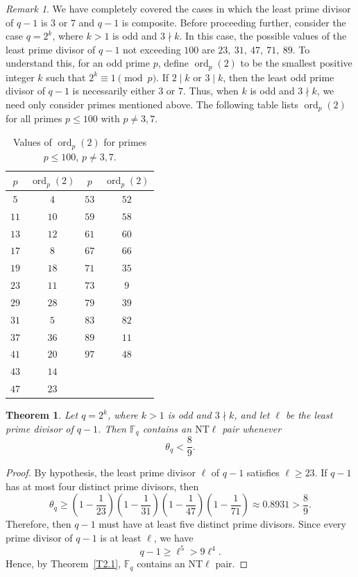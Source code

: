 \documentclass[12pt]{amsart}
\newtheorem{theorem}{Theorem}[section]
\theoremstyle{definition}
\theoremstyle{remark}
\newtheorem*{remark}{Remark}
\numberwithin{equation}{section}
\begin{document}
\begin{remark}
We have completely covered the cases in which the least prime divisor of $q-1$ is $3$ or $7$ and $q-1$ is composite. Before proceeding further, consider the case $q=2^k$, where $k>1$ is odd and $3\nmid k$. In this case, the possible values of the least prime divisor of $q-1$ not exceeding $100$ are $23,\ 31,\ 47,\ 71,\ 89$.
To understand this, for an odd prime $p$, define $\operatorname{ord}_p(2)$ to be the smallest positive integer $k$ such that $2^k\equiv1\pmod p$.
If $2\mid k$ or $3\mid k$, then the least odd prime divisor of $q-1$ is necessarily either $3$ or $7$. Thus, when $k$ is odd and $3\nmid k$, we need only consider primes mentioned above. The following table lists $\operatorname{ord}_p(2)$ for all primes $p\leq100$ with $p\neq3,7$.

\begin{table}[h]
\centering
\small
\begin{tabular}{c|c||c|c}
\hline
$p$ & $\operatorname{ord}_p(2)$ & $p$ & $\operatorname{ord}_p(2)$ \\
\hline
$5$  & $4$  & $53$ & $52$ \\
$11$ & $10$ & $59$ & $58$ \\
$13$ & $12$ & $61$ & $60$ \\
$17$ & $8$  & $67$ & $66$ \\
$19$ & $18$ & $71$ & $35$ \\
$23$ & $11$ & $73$ & $9$  \\
$29$ & $28$ & $79$ & $39$ \\
$31$ & $5$  & $83$ & $82$ \\
$37$ & $36$ & $89$ & $11$ \\
$41$ & $20$ & $97$ & $48$ \\
$43$ & $14$ &      &      \\
$47$ & $23$ &      &      \\
\hline
\end{tabular}
\caption{Values of $\operatorname{ord}_p(2)$ for primes $p\leq100$, $p\neq3,7$.}
\label{tab:ord2}
\end{table}
\end{remark}
\begin{theorem}\label{L2.4}
Let $q=2^k$, where $k>1$ is odd and $3\nmid k$, and let $\ell$ be the least prime divisor of $q-1$. Then $\mathbb{F}_q$ contains an $\mathrm{NT}\ell$ pair whenever
\[
\theta_q<\frac{8}{9}.
\]
\end{theorem}
\begin{proof}
By hypothesis, the least prime divisor $\ell$ of $q-1$ satisfies $\ell\geq23$. If $q-1$ has at most four distinct prime divisors, then
\[
\theta_q
\geq
\left(1-\frac{1}{23}\right)
\left(1-\frac{1}{31}\right)
\left(1-\frac{1}{47}\right)
\left(1-\frac{1}{71}\right)
\approx 0.8931
>
\frac{8}{9}.
\]
Therefore, then $q-1$ must have at least five distinct prime divisors. Since every prime divisor of $q-1$ is at least $\ell$, we have
\[
q-1\geq \ell^5>9\ell^4.
\]
Hence, by Theorem~\ref{T2.1}, $\mathbb{F}_q$ contains an $\mathrm{NT}\ell$ pair. 
\end{proof}
\end{document}
